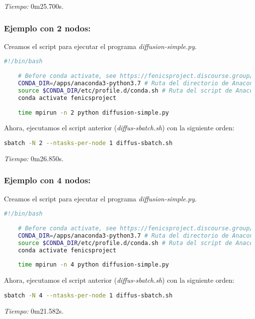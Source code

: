\textit{Tiempo:} 0m25.700s.

\subsubsection*{Ejemplo con 2 nodos:}
Creamos el script para ejecutar el programa \textit{diffusion-simple.py}.
\begin{lstlisting}[language=sh]
	#!/bin/bash
	
	# Before conda activate, see https://fenicsproject.discourse.group/t/fenics-from-conda-doesnt-import/3502/6
	CONDA_DIR=/apps/anaconda3-python3.7 # Ruta del directorio de Anaconda
	source $CONDA_DIR/etc/profile.d/conda.sh # Ruta del script de Anaconda
	conda activate fenicsproject
	
	time mpirun -n 2 python diffusion-simple.py
\end{lstlisting}

Ahora, ejecutamos el script anterior (\textit{diffus-sbatch.sh}) con la siguiente orden:
\begin{lstlisting}[language=sh]
	sbatch -N 2 --ntasks-per-node 1 diffus-sbatch.sh
\end{lstlisting}

\textit{Tiempo:} 0m26.850s.

\subsubsection*{Ejemplo con 4 nodos:}
Creamos el script para ejecutar el programa \textit{diffusion-simple.py}.
\begin{lstlisting}[language=sh]
	#!/bin/bash
	
	# Before conda activate, see https://fenicsproject.discourse.group/t/fenics-from-conda-doesnt-import/3502/6
	CONDA_DIR=/apps/anaconda3-python3.7 # Ruta del directorio de Anaconda
	source $CONDA_DIR/etc/profile.d/conda.sh # Ruta del script de Anaconda
	conda activate fenicsproject
	
	time mpirun -n 4 python diffusion-simple.py
\end{lstlisting}

Ahora, ejecutamos el script anterior (\textit{diffus-sbatch.sh}) con la siguiente orden:
\begin{lstlisting}[language=sh]
	sbatch -N 4 --ntasks-per-node 1 diffus-sbatch.sh
\end{lstlisting}

\textit{Tiempo:} 0m21.582s.

